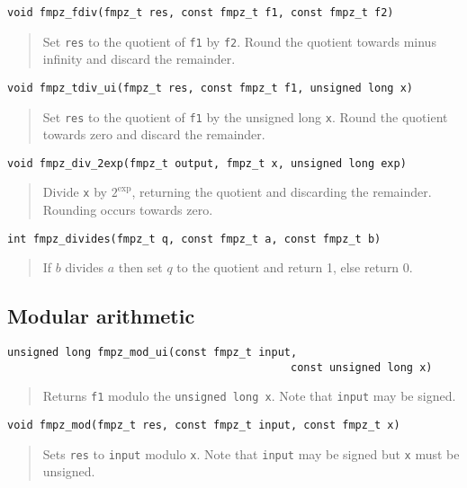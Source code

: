 \documentclass[a4paper,10pt]{article}
\newcommand{\code}{\lstinline}
\begin{document}
\begin{lstlisting}
void fmpz_fdiv(fmpz_t res, const fmpz_t f1, const fmpz_t f2)
\end{lstlisting}
\begin{quote}
Set \code{res} to the quotient of \code{f1} by \code{f2}. Round the quotient towards minus infinity and discard the remainder.
\end{quote}

\begin{lstlisting}
void fmpz_tdiv_ui(fmpz_t res, const fmpz_t f1, unsigned long x)
\end{lstlisting}
\begin{quote}
Set \code{res} to the quotient of \code{f1} by the unsigned long \code{x}. Round the quotient towards zero and discard the remainder.
\end{quote}

\begin{lstlisting}
void fmpz_div_2exp(fmpz_t output, fmpz_t x, unsigned long exp)
\end{lstlisting}
\begin{quote}
Divide \code{x} by $2^{\mbox{exp}}$, returning the quotient and discarding the remainder. Rounding occurs towards zero.
\end{quote}

\begin{lstlisting}
int fmpz_divides(fmpz_t q, const fmpz_t a, const fmpz_t b) 
\end{lstlisting}
\begin{quote}
If $b$ divides $a$ then set $q$ to the quotient and return 1, else return 0.
\end{quote}

\subsection{Modular arithmetic}

\begin{lstlisting}
unsigned long fmpz_mod_ui(const fmpz_t input, 
                                            const unsigned long x)
\end{lstlisting}
\begin{quote}
Returns \code{f1} modulo the \code{unsigned long x}. Note that \code{input} may be signed.
\end{quote}

\begin{lstlisting}
void fmpz_mod(fmpz_t res, const fmpz_t input, const fmpz_t x) 
\end{lstlisting}
\begin{quote}
Sets \code{res} to \code{input} modulo \code{x}. Note that \code{input} may be signed but \code{x} must be unsigned.
\end{quote}
\end{document}
